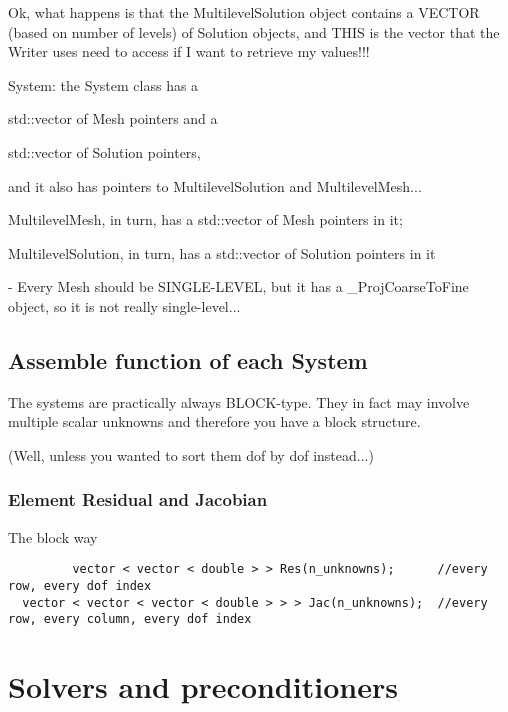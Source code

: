 \documentclass[10pt]{book}
\begin{document}
   Ok, what happens is that the MultilevelSolution object contains a VECTOR (based on number of levels) of Solution objects,
   and THIS is the vector that the Writer uses need to access if I want to retrieve my values!!!
   
   
   System: the System class has a 
   
   std::vector of Mesh pointers and a 
   
   std::vector of Solution pointers,
   
   and it also has pointers to MultilevelSolution and MultilevelMesh...
   
   MultilevelMesh, in turn, has a std::vector of Mesh pointers in it;
   
   MultilevelSolution, in turn, has a std::vector of Solution pointers in it
   
   
   - Every Mesh should be SINGLE-LEVEL, but it has a \_ProjCoarseToFine object, so it is not really single-level...
      

      
   \section{Assemble function of each System}
   
     The systems are practically always BLOCK-type. 
     They in fact may involve multiple scalar unknowns and therefore you have a block structure.
     
     (Well, unless you wanted to sort them dof by dof instead...)
     
     
    \subsection{Element Residual and Jacobian}
     
     The block way
     
      \begin{verbatim}
         vector < vector < double > > Res(n_unknowns);      //every row, every dof index
  vector < vector < vector < double > > > Jac(n_unknowns);  //every row, every column, every dof index

      \end{verbatim}

     
     
     
      
      
\chapter{Solvers and preconditioners}
\end{document}
